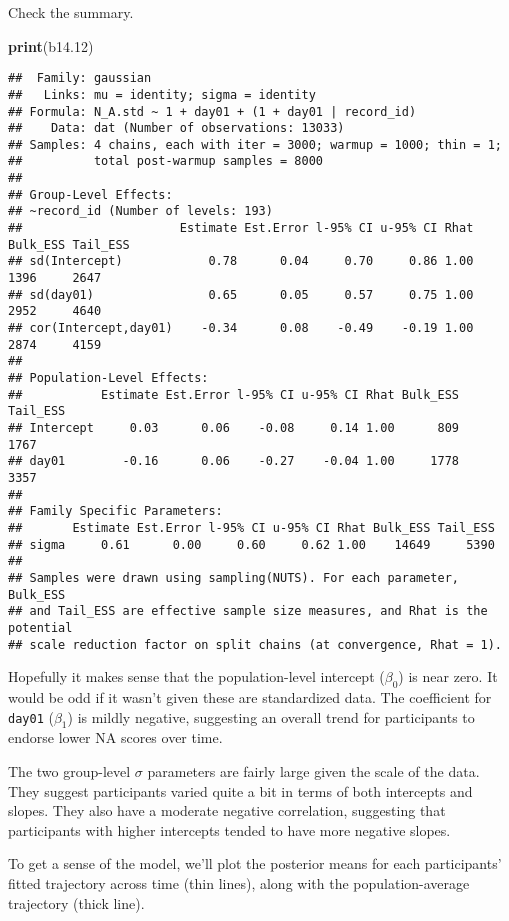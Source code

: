 \documentclass[]{article}
\newenvironment{Shaded}{\begin{snugshade}}{\end{snugshade}}
\newcommand{\FloatTok}[1]{\textcolor[rgb]{0.00,0.00,0.81}{#1}}
\newcommand{\KeywordTok}[1]{\textcolor[rgb]{0.13,0.29,0.53}{\textbf{#1}}}
\newcommand{\NormalTok}[1]{#1}
\begin{document}
Check the summary.

\begin{Shaded}
\begin{Highlighting}[]
\KeywordTok{print}\NormalTok{(b14}\FloatTok{.12}\NormalTok{)}
\end{Highlighting}
\end{Shaded}

\begin{verbatim}
##  Family: gaussian 
##   Links: mu = identity; sigma = identity 
## Formula: N_A.std ~ 1 + day01 + (1 + day01 | record_id) 
##    Data: dat (Number of observations: 13033) 
## Samples: 4 chains, each with iter = 3000; warmup = 1000; thin = 1;
##          total post-warmup samples = 8000
## 
## Group-Level Effects: 
## ~record_id (Number of levels: 193) 
##                      Estimate Est.Error l-95% CI u-95% CI Rhat Bulk_ESS Tail_ESS
## sd(Intercept)            0.78      0.04     0.70     0.86 1.00     1396     2647
## sd(day01)                0.65      0.05     0.57     0.75 1.00     2952     4640
## cor(Intercept,day01)    -0.34      0.08    -0.49    -0.19 1.00     2874     4159
## 
## Population-Level Effects: 
##           Estimate Est.Error l-95% CI u-95% CI Rhat Bulk_ESS Tail_ESS
## Intercept     0.03      0.06    -0.08     0.14 1.00      809     1767
## day01        -0.16      0.06    -0.27    -0.04 1.00     1778     3357
## 
## Family Specific Parameters: 
##       Estimate Est.Error l-95% CI u-95% CI Rhat Bulk_ESS Tail_ESS
## sigma     0.61      0.00     0.60     0.62 1.00    14649     5390
## 
## Samples were drawn using sampling(NUTS). For each parameter, Bulk_ESS
## and Tail_ESS are effective sample size measures, and Rhat is the potential
## scale reduction factor on split chains (at convergence, Rhat = 1).
\end{verbatim}

Hopefully it makes sense that the population-level intercept
(\(\beta_0\)) is near zero. It would be odd if it wasn't given these are
standardized data. The coefficient for \texttt{day01} (\(\beta_1\)) is
mildly negative, suggesting an overall trend for participants to endorse
lower NA scores over time.

The two group-level \(\sigma\) parameters are fairly large given the
scale of the data. They suggest participants varied quite a bit in terms
of both intercepts and slopes. They also have a moderate negative
correlation, suggesting that participants with higher intercepts tended
to have more negative slopes.

To get a sense of the model, we'll plot the posterior means for each
participants' fitted trajectory across time (thin lines), along with the
population-average trajectory (thick line).
\end{document}

